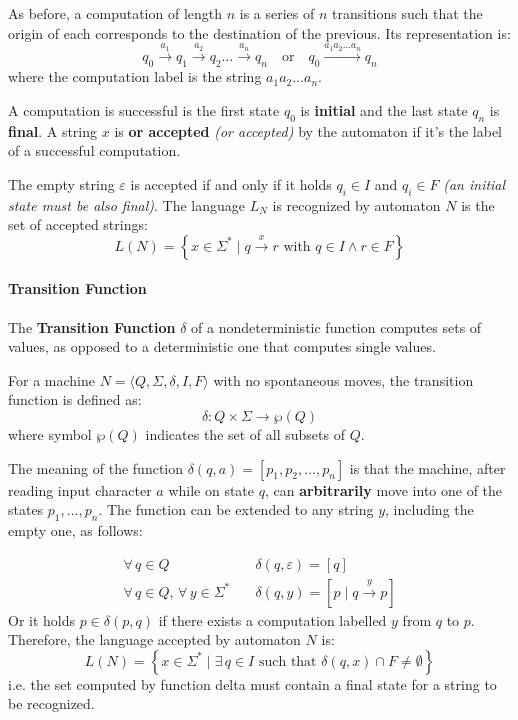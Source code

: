 \documentclass[english]{article}
\begin{document}
As before, a computation of length \(n\) is a series of \(n\) transitions such that the origin of each corresponds to the destination of the previous. Its representation is:
\[ q_0 \xrightarrow{a_1} q_1 \xrightarrow{a_2} q_2 \ldots \xrightarrow{a_n} q_n \quad \text{or} \quad q_0 \xrightarrow{a_1 a_2 \ldots a_n} q_n \]
where the computation label is the string \(a_1 a_2 \ldots a_n\).

A computation is successful is the first state \(q_0\) is \textbf{initial} and the last state \(q_n\) is \textbf{final}.
A string \(x\) is \textbf{or accepted} \textit{(or accepted)} by the automaton if it's the label of a successful computation.

The empty string \(\varepsilon\) is accepted if and only if it holds \(q_i \in I\) and \(q_i \in F\) \textit{(an initial state must be also final)}.
The language \(L_N\) is recognized by automaton \(N\) is the set of accepted strings:
\[ L(N) = \left\{ x \in \Sigma^\ast \mid q \xrightarrow{x} r \text{ with } q \in I \land r \in F \right\} \]

\paragraph{Transition Function}

The \textbf{Transition Function} \(\delta\) of a nondeterministic function computes sets of values, as opposed to a deterministic one that computes single values.

For a machine \(N = \langle Q, \Sigma, \delta, I, F \rangle\) with no spontaneous moves, the transition function is defined as:
\[ \delta : Q \times \Sigma \rightarrow \wp(Q) \]
where symbol \(\wp(Q)\) indicates the set of all subsets of \(Q\).

The meaning of the function \(\delta(q, a) = \left[ p_1, p_2, \ldots, p_n \right]\) is that the machine, after reading input character \(a\) while on state \(q\), can \textbf{arbitrarily} move into one of the states \(p_1, \ldots, p_n\).
The function can be extended to any string \(y\), including the empty one, as follows:

\begin{align*}
  \forall \, q \in Q \quad                                  & \delta(q, \varepsilon) = \left[ q \right]                \\
  \forall \, q \in Q, \, \forall \, y \in \Sigma^\ast \quad & \delta(q, y) = \left[ p \mid q \xrightarrow{y} p \right]
\end{align*}
Or it holds \(p \in \delta(p, q)\) if there exists a computation labelled \(y\) from \(q\) to \(p\).
Therefore, the language accepted by automaton \(N\) is:
\[ L(N) = \left\{ x \in \Sigma^\ast \mid \exists \, q \in I \text{ such that } \delta(q, x) \cap F \neq \emptyset \right\} \]
i.e. the set computed by function delta must contain a final state for a string to be recognized.
\end{document}
